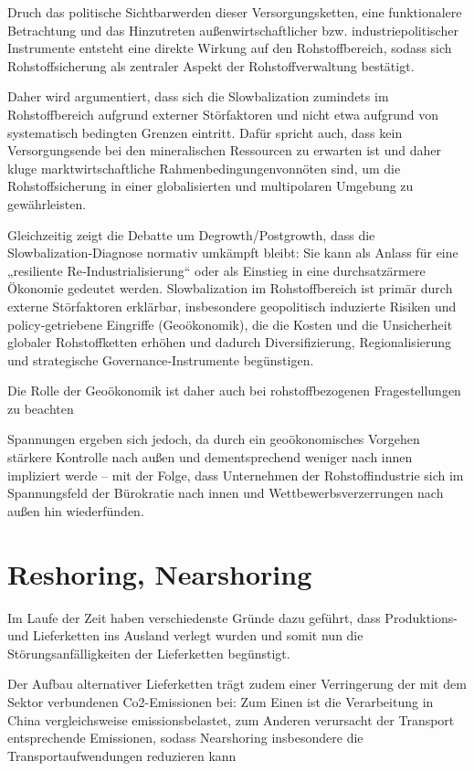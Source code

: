 \documentclass[12pt,a4paper,oneside]{book} %
\begin{document}
Druch das politische Sichtbarwerden dieser Versorgungsketten, eine funktionalere Betrachtung und das Hinzutreten außenwirtschaftlicher bzw. industriepolitischer Instrumente entsteht eine direkte Wirkung auf den Rohstoffbereich, sodass sich Rohstoffsicherung als zentraler Aspekt der Rohstoffverwaltung bestätigt.

Daher wird argumentiert, dass sich die Slowbalization zumindets im Rohstoffbereich aufgrund externer Störfaktoren und nicht etwa aufgrund von systematisch bedingten Grenzen eintritt. Dafür spricht auch, dass kein Versorgungsende bei den mineralischen Ressourcen zu erwarten ist und daher \glqq kluge marktwirtschaftliche Rahmenbedingungen\grqq vonnöten sind, um die Rohstoffsicherung in einer globalisierten und multipolaren Umgebung zu gewährleisten.\autocite{Frez 2025, S. 95}

 Gleichzeitig zeigt die Debatte um Degrowth/Postgrowth, dass die Slowbalization‑Diagnose normativ umkämpft bleibt: Sie kann als Anlass für eine „resiliente Re‑Industrialisierung“ oder als Einstieg in eine durchsatzärmere Ökonomie gedeutet werden. Slowbalization im Rohstoffbereich ist primär durch externe Störfaktoren erklärbar, insbesondere geopolitisch induzierte Risiken und policy‑getriebene Eingriffe (Geoökonomik), die die Kosten und die Unsicherheit globaler Rohstoffketten erhöhen und dadurch Diversifizierung, Regionalisierung und strategische Governance‑Instrumente begünstigen.
 
 Die Rolle der Geoökonomik ist daher auch bei rohstoffbezogenen Fragestellungen zu beachten
 
 Spannungen ergeben sich jedoch, da durch ein geoökonomisches Vorgehen stärkere Kontrolle nach außen und dementsprechend weniger nach innen impliziert werde -- mit der Folge, dass Unternehmen der Rohstoffindustrie sich im Spannungsfeld der Bürokratie nach innen und Wettbewerbsverzerrungen nach außen hin wiederfünden.\autocite{Frenz 2025, S. 314}
 
 \section{Reshoring, Nearshoring}
 
 Im Laufe der Zeit haben verschiedenste Gründe dazu geführt, dass Produktions- und Lieferketten ins Ausland verlegt wurden und somit nun die Störungsanfälligkeiten der Lieferketten begünstigt.
 
 Der Aufbau alternativer Lieferketten trägt zudem einer Verringerung der mit dem Sektor verbundenen Co2-Emissionen bei: Zum Einen ist die Verarbeitung in China vergleichsweise emissionsbelastet, zum Anderen verursacht der Transport entsprechende Emissionen, sodass Nearshoring insbesondere die Transportaufwendungen reduzieren kann
 
\end{document}
